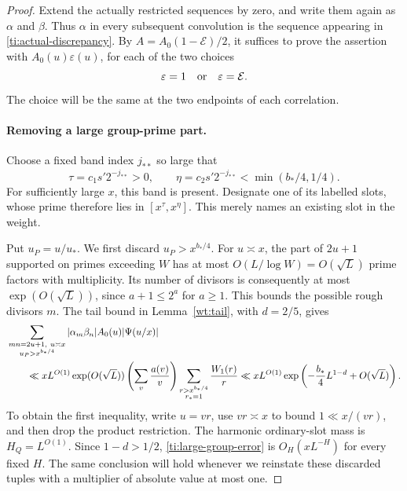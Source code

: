 \begin{proof}
Extend the actually restricted sequences by zero, and write them again
as $\alpha$ and $\beta$. Thus $\alpha$ in every subsequent convolution
is the sequence appearing in \eqref{ti:actual-discrepancy}. By
$A=A_0(1-\mathcal E)/2$, it suffices to prove the assertion with
$A_0(u)\varepsilon(u)$, for each of the two choices
\[
                    \varepsilon=1\quad\hbox{or}\quad
                    \varepsilon=\mathcal E.
\]
The choice will be the same at the two endpoints of each correlation.

\paragraph{Removing a large group-prime part.}
Choose a fixed band index $j_{**}$ so large that
\begin{equation}\label{ti:designated-range}
 \tau=c_1s'2^{-j_{**}}>0,\qquad
 \eta=c_2s'2^{-j_{**}}<\min(b_*/4,1/4).
\end{equation}
For sufficiently large $x$, this band is present. Designate one of its
labelled slots, whose prime therefore lies in $[x^\tau,x^\eta]$.
This merely names an existing slot in the weight.

Put $u_P=u/u_*$. We first discard $u_P>x^{b_*/4}$. For $u\asymp x$,
the part of $2u+1$ supported on primes exceeding $W$ has at most
$O(L/\log W)=O(\sqrt L)$ prime factors with multiplicity. Its number
of divisors is consequently at most $\exp(O(\sqrt L))$, since
$a+1\le2^a$ for $a\ge1$. This bounds the possible rough divisors $m$.
The tail bound in Lemma~\ref{wt:tail}, with $d=2/5$, gives
\begin{align}
 &\sum_{\substack{mn=2u+1,\ u\asymp x\\u_P>x^{b_*/4}}}
          |\alpha_m\beta_n|A_0(u)|\Psi(u/x)|\notag\\
 &\qquad\ll
 xL^{O(1)}\exp(O(\sqrt L))
   \left(\sum_v\frac{a(v)}v\right)
   \sum_{\substack{r>x^{b_*/4}\\r_*=1}}\frac{W_1(r)}r
 \ll xL^{O(1)}
       \exp\left(-\frac{b_*}{4}L^{1-d}+O(\sqrt L)\right).
 \label{ti:large-group-error}
\end{align}
To obtain the first inequality, write $u=vr$, use $vr\asymp x$ to
bound $1\ll x/(vr)$, and then drop the product restriction.
The harmonic ordinary-slot mass is $H_Q=L^{O(1)}$. Since $1-d>1/2$,
\eqref{ti:large-group-error} is $O_H(xL^{-H})$ for every fixed $H$.
The same conclusion will hold whenever we reinstate these discarded
tuples with a multiplier of absolute value at most one.


\end{proof}
